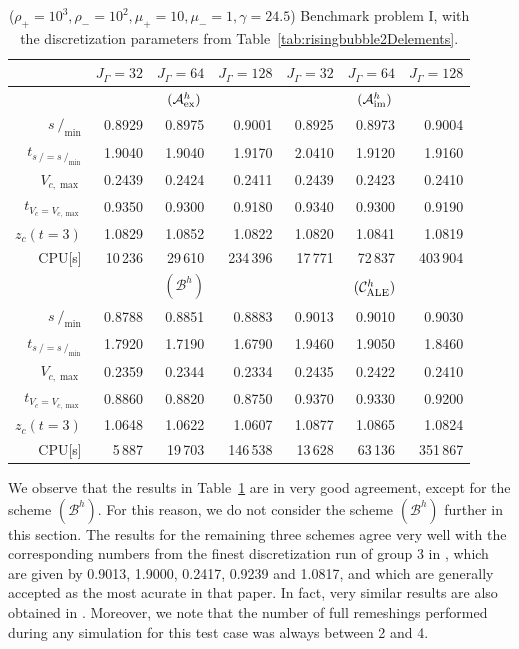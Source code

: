 \documentclass[a4paper,12pt,onecolumn]{article}
\newcommand{\strikes}{\mbox{$s\!\!\!\!\:/$}}
\newcommand{\schemeAex}{{\mathcal{A}^h_{\rm ex}}}
\newcommand{\schemeAim}{{\mathcal{A}^h_{\rm im}}}
\newcommand{\schemeB}{{\mathcal{B}^h}}
\newcommand{\schemeALE}{{\mathcal{C}^h_{\rm ALE}}}
\begin{document}
\begin{table}
\center
\hspace*{-3.25cm}
\begin{tabular}{r|rrr|rrr|}
\hline
 & $J_\Gamma=32$ & $J_\Gamma=64$ & $J_\Gamma=128$
 & $J_\Gamma=32$ & $J_\Gamma=64$ & $J_\Gamma=128$ \\ \hline
& \multicolumn{3}{c|}{$(\schemeAex)$} & \multicolumn{3}{c|}{$(\schemeAim)$} \\
\cmidrule{2-7}
$\strikes_{\min}$                & 0.8929 & 0.8975 & 0.9001  & 0.8925 & 0.8973 & 0.9004 \\
$t_{\strikes = \strikes_{\min}}$ & 1.9040 & 1.9040 & 1.9170  & 2.0410 & 1.9120 & 1.9160 \\
$V_{c,\max}$                     & 0.2439 & 0.2424 & 0.2411  & 0.2439 & 0.2423 & 0.2410 \\
$t_{V_c = V_{c,\max}}$           & 0.9350 & 0.9300 & 0.9180  & 0.9340 & 0.9300 & 0.9190 \\
$z_c(t=3)$                       & 1.0829 & 1.0852 & 1.0822  & 1.0820 & 1.0841 & 1.0819 \\
CPU[s]                           &  10\,236 &  29\,610 & 234\,396  &  17\,771 &  72\,837 & 403\,904 \\
\cmidrule{2-7}
& \multicolumn{3}{c|}{$(\schemeB)$} & \multicolumn{3}{c|}{$(\schemeALE)$} \\
\cmidrule{2-7}
$\strikes_{\min}$                & 0.8788 & 0.8851 & 0.8883  & 0.9013 & 0.9010 & 0.9030 \\
$t_{\strikes = \strikes_{\min}}$ & 1.7920 & 1.7190 & 1.6790  & 1.9460 & 1.9050 & 1.8460 \\
$V_{c,\max}$                     & 0.2359 & 0.2344 & 0.2334  & 0.2435 & 0.2422 & 0.2410 \\
$t_{V_c = V_{c,\max}}$           & 0.8860 & 0.8820 & 0.8750  & 0.9370 & 0.9330 & 0.9200 \\
$z_c(t=3)$                       & 1.0648 & 1.0622 & 1.0607  & 1.0877 & 1.0865 & 1.0824 \\
CPU[s]                           &   5\,887 &  19\,703 & 146\,538  &  13\,628 &  63\,136 & 351\,867 \\
\hline
\end{tabular}
\hspace*{-3.25cm}
\caption{($\rho_+ = 10^3,\rho_- = 10^2,\mu_+ = 10,\mu_- =1,\gamma = 24.5$)
Benchmark problem I, with the discretization parameters from
Table~\ref{tab:risingbubble2Delements}.}
\label{tab:risingbubbleIp2p1p0}
\end{table}%
We observe that the results in Table~\ref{tab:risingbubbleIp2p1p0} are in very
good agreement, except for the scheme $(\schemeB)$. For this reason, we do
not consider the scheme $(\schemeB)$ further in this section.
The results for the remaining three schemes agree very well with
the corresponding
numbers from the finest discretization run of group 3 in \cite{HysingTKPBGT09},
which are given by 0.9013, 1.9000, 0.2417, 0.9239 and 1.0817,
and which are generally accepted as the most acurate in that paper.
In fact, very similar results are also obtained in 
\cite[Tables ~2 and 3]{fluidfbp}.
Moreover, we note that the number of full remeshings performed during
any simulation for this test case was always between 2 and 4.
\end{document}
